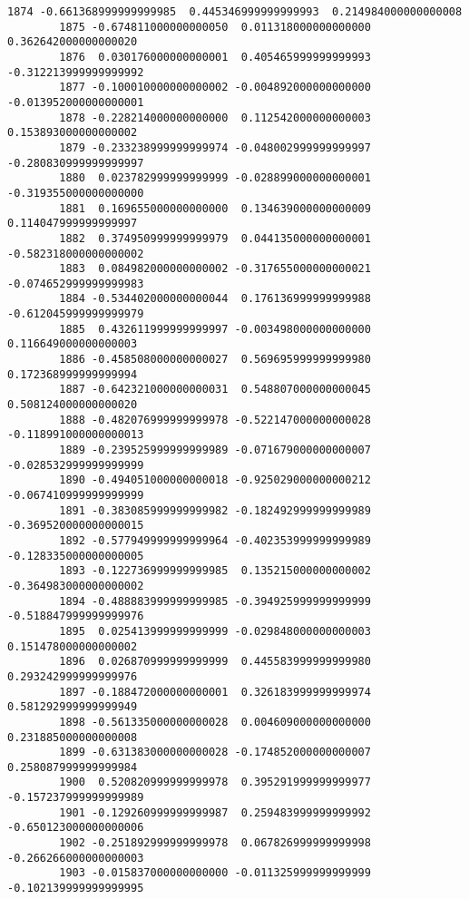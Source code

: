 \documentclass[11pt]{article}
\begin{document}
\begin{Verbatim}[commandchars=\\\{\}]
        1874 -0.661368999999999985  0.445346999999999993  0.214984000000000008   
        1875 -0.674811000000000050  0.011318000000000000  0.362642000000000020   
        1876  0.030176000000000001  0.405465999999999993 -0.312213999999999992   
        1877 -0.100010000000000002 -0.004892000000000000 -0.013952000000000001   
        1878 -0.228214000000000000  0.112542000000000003  0.153893000000000002   
        1879 -0.233238999999999974 -0.048002999999999997 -0.280830999999999997   
        1880  0.023782999999999999 -0.028899000000000001 -0.319355000000000000   
        1881  0.169655000000000000  0.134639000000000009  0.114047999999999997   
        1882  0.374950999999999979  0.044135000000000001 -0.582318000000000002   
        1883  0.084982000000000002 -0.317655000000000021 -0.074652999999999983   
        1884 -0.534402000000000044  0.176136999999999988 -0.612045999999999979   
        1885  0.432611999999999997 -0.003498000000000000  0.116649000000000003   
        1886 -0.458508000000000027  0.569695999999999980  0.172368999999999994   
        1887 -0.642321000000000031  0.548807000000000045  0.508124000000000020   
        1888 -0.482076999999999978 -0.522147000000000028 -0.118991000000000013   
        1889 -0.239525999999999989 -0.071679000000000007 -0.028532999999999999   
        1890 -0.494051000000000018 -0.925029000000000212 -0.067410999999999999   
        1891 -0.383085999999999982 -0.182492999999999989 -0.369520000000000015   
        1892 -0.577949999999999964 -0.402353999999999989 -0.128335000000000005   
        1893 -0.122736999999999985  0.135215000000000002 -0.364983000000000002   
        1894 -0.488883999999999985 -0.394925999999999999 -0.518847999999999976   
        1895  0.025413999999999999 -0.029848000000000003  0.151478000000000002   
        1896  0.026870999999999999  0.445583999999999980  0.293242999999999976   
        1897 -0.188472000000000001  0.326183999999999974  0.581292999999999949   
        1898 -0.561335000000000028  0.004609000000000000  0.231885000000000008   
        1899 -0.631383000000000028 -0.174852000000000007  0.258087999999999984   
        1900  0.520820999999999978  0.395291999999999977 -0.157237999999999989   
        1901 -0.129260999999999987  0.259483999999999992 -0.650123000000000006   
        1902 -0.251892999999999978  0.067826999999999998 -0.266266000000000003   
        1903 -0.015837000000000000 -0.011325999999999999 -0.102139999999999995   
        

\end{Verbatim}
\end{document}
